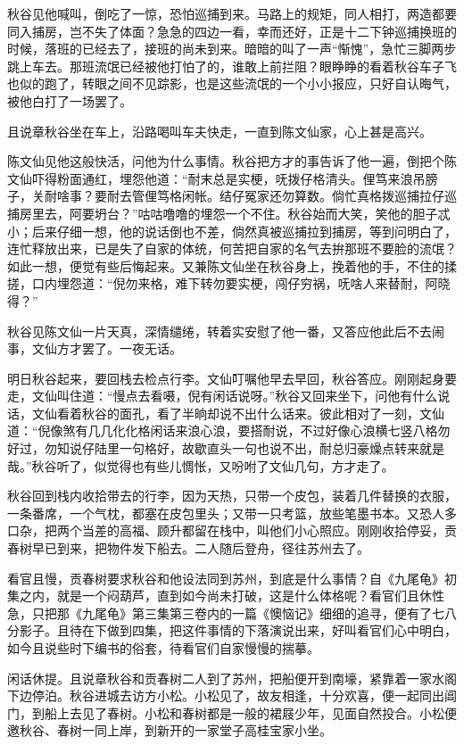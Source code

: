 \documentclass[12pt,UTF8]{ctexbook}
\begin{document}
{{{秋谷见他喊叫，倒吃了一惊，恐怕巡捕到来。马路上的规矩，同人相打，两造都要同入捕房，岂不失了体面？急急的四边一看，幸而还好，正是十二下钟巡捕换班的时候，落班的已经去了，接班的尚未到来。暗暗的叫了一声“惭愧”，急忙三脚两步跳上车去。那班流氓已经被他打怕了的，谁敢上前拦阻？眼睁睁的看着秋谷车子飞也似的跑了，转眼之间不见踪影，也是这些流氓的一个小小报应，只好自认晦气，被他白打了一场罢了。

且说章秋谷坐在车上，沿路喝叫车夫快走，一直到陈文仙家，心上甚是高兴。

陈文仙见他这般快活，问他为什么事情。秋谷把方才的事告诉了他一遍，倒把个陈文仙吓得粉面通红，埋怨他道：“耐末总是实梗，呒拨仔格清头。俚笃来浪吊膀子，关耐啥事？要耐去管俚笃格闲帐。结仔冤家还勿算数。倘忙真格拨巡捕拉仔巡捕房里去，阿要坍台？”咕咕噜噜的埋怨一个不住。秋谷始而大笑，笑他的胆子忒小；后来仔细一想，他的说话倒也不差，倘然真被巡捕拉到捕房，等到问明白了，连忙释放出来，已是失了自家的体统，何苦把自家的名气去拚那班不要脸的流氓？如此一想，便觉有些后悔起来。又兼陈文仙坐在秋谷身上，挽着他的手，不住的揉搓，口内埋怨道：“倪勿来格，难下转勿要实梗，闯仔穷祸，呒啥人来替耐，阿晓得？”

秋谷见陈文仙一片天真，深情缱绻，转着实安慰了他一番，又答应他此后不去闹事，文仙方才罢了。一夜无话。

明日秋谷起来，要回栈去检点行李。文仙叮嘱他早去早回，秋谷答应。刚刚起身要走，文仙叫住道：“慢点去看嗫，倪有闲话说呀。”秋谷又回来坐下，问他有什么说话，文仙看着秋谷的面孔，看了半晌却说不出什么话来。彼此相对了一刻，文仙道：“倪像煞有几几化化格闲话来浪心浪，要搭耐说，不过好像心浪横七竖八格勿好过，勿知说仔陆里一句格好，故歇直头一句也说不出，耐总归豪燥点转来就是哉。”秋谷听了，似觉得也有些儿惆怅，又吩咐了文仙几句，方才走了。

秋谷回到栈内收拾带去的行李，因为天热，只带一个皮包，装着几件替换的衣服，一条番席，一个气枕，都塞在皮包里头；又带一只考篮，放些笔墨书本。又恐人多口杂，把两个当差的高福、顾升都留在栈中，叫他们小心照应。刚刚收拾停妥，贡春树早已到来，把物件发下船去。二人随后登舟，径往苏州去了。

看官且慢，贡春树要求秋谷和他设法同到苏州，到底是什么事情？自《九尾龟》初集之内，就是一个闷葫芦，直到如今尚未打破，这是什么体格呢？看官们且休性急，只把那《九尾龟》第三集第三卷内的一篇《懊恼记》细细的追寻，便有了七八分影子。且待在下做到四集，把这件事情的下落演说出来，好叫看官们心中明白，如今且说些时下编书的俗套，待看官们自家慢慢的揣摹。

闲话休提。且说章秋谷和贡春树二人到了苏州，把船便开到南壕，紧靠着一家水阁下边停泊。秋谷进城去访方小松。小松见了，故友相逢，十分欢喜，便一起同出阊门，到船上去见了春树。小松和春树都是一般的裙屐少年，见面自然投合。小松便邀秋谷、春树一同上岸，到新开的一家堂子高桂宝家小坐。

}}}
\end{document}
